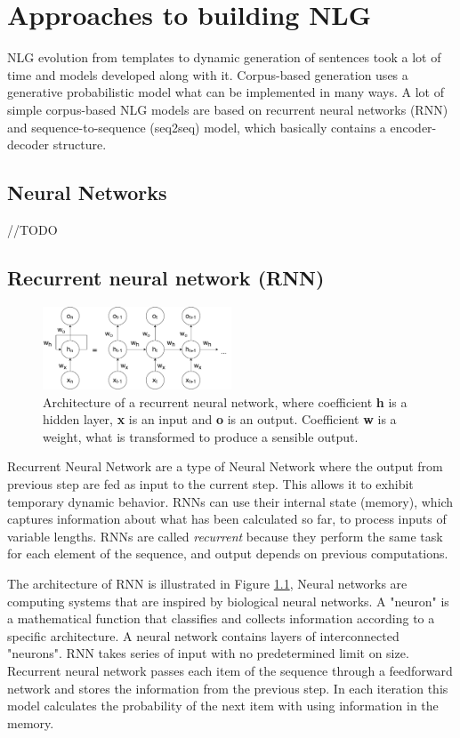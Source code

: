 \chapter{Approaches to building NLG}
NLG evolution from templates to dynamic generation of sentences took a lot of time and models developed along with it. Corpus-based generation uses a generative probabilistic model what can be implemented in many ways. A lot of simple corpus-based NLG models are based on recurrent neural networks (RNN) and sequence-to-sequence (seq2seq) model, which basically contains a encoder-decoder structure.

\section{Neural Networks}
//TODO

\section{Recurrent neural network (RNN)}

\begin{figure}[hbt]
  \centering
  \includegraphics[width=0.5\textwidth]{figures/rnn.pdf}
  \caption{Architecture of a recurrent neural network, where coefficient \textbf{h} is a hidden layer, \textbf{x} is an input and \textbf{o} is an output. Coefficient \textbf{w} is a weight, what is transformed to produce a sensible output.}
  \label{rnn}
\end{figure}

Recurrent Neural Network are a type of Neural Network where the output from previous step are fed as input to the current step. This allows it to exhibit temporary dynamic behavior. RNNs can use their internal state (memory), which captures information about what has been calculated so far, to process inputs of variable lengths. RNNs are called \textit{recurrent} because they perform the same task for each element of the sequence, and output depends on previous computations.

The architecture of RNN is illustrated in Figure \ref{rnn}, 
Neural networks are computing systems that are inspired by biological neural networks. A "neuron" is a mathematical function that classifies and collects information according to a specific architecture. A neural network contains layers of interconnected "neurons". RNN takes series of input with no predetermined limit on size. Recurrent neural network passes each item of the sequence through a feedforward network and stores the information from the previous step. In each iteration this model calculates the probability of the next item with using information in the memory.



